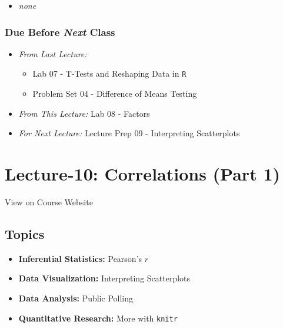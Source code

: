 \documentclass[]{book}
\providecommand{\tightlist}{%
  \setlength{\itemsep}{0pt}\setlength{\parskip}{0pt}}
\theoremstyle{definition}
\theoremstyle{definition}
\theoremstyle{definition}
\theoremstyle{remark}
\begin{document}
\begin{itemize}
\tightlist
\item
  \emph{none}
\end{itemize}

\hypertarget{due-before-next-class-8}{%
\subsubsection*{\texorpdfstring{Due Before \emph{Next}
Class}{Due Before Next Class}}\label{due-before-next-class-8}}

\begin{itemize}
\tightlist
\item
  \emph{From Last Lecture:}

  \begin{itemize}
  \tightlist
  \item
    Lab 07 - T-Tests and Reshaping Data in \texttt{R}
  \item
    Problem Set 04 - Difference of Means Testing
  \end{itemize}
\item
  \emph{From This Lecture:} Lab 08 - Factors
\item
  \emph{For Next Lecture:} Lecture Prep 09 - Interpreting Scatterplots
\end{itemize}

\hypertarget{lecture-10-correlations-part-1}{%
\section*{Lecture-10: Correlations (Part
1)}\label{lecture-10-correlations-part-1}}

View on Course Website

\hypertarget{topics-10}{%
\subsection*{Topics}\label{topics-10}}

\begin{itemize}
\tightlist
\item
  \textbf{Inferential Statistics:} Pearson's \(r\)
\item
  \textbf{Data Visualization:} Interpreting Scatterplots
\item
  \textbf{Data Analysis:} Public Polling
\item
  \textbf{Quantitative Research:} More with \texttt{knitr}
\end{itemize}
\end{document}

